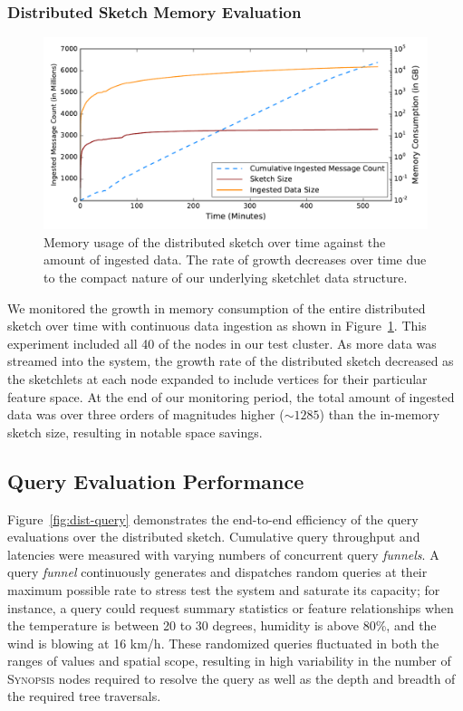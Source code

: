 \subsubsection{Distributed Sketch Memory Evaluation}
%
\begin{figure}
    \centerline{\includegraphics[width=\linewidth]{figures/ing-and-mem-usage.pdf}}
    \caption{Memory usage of the distributed sketch over time against the amount of ingested data. The rate of growth decreases over time due to the compact nature of our underlying sketchlet data structure.}
    \label{fig:dist-sketch-mem-usage}
\end{figure}

We monitored the growth in memory consumption of the entire distributed sketch over time with continuous data ingestion as shown in Figure~\ref{fig:dist-sketch-mem-usage}. This experiment included all 40 of the nodes in our test cluster.  As more data was streamed into the system, the growth rate of the distributed sketch decreased as the sketchlets at each node expanded to include vertices for their particular feature space.  At the end of our monitoring period, the total amount of ingested data was over three orders of magnitudes higher ($\sim 1285$) than the in-memory sketch size, resulting in notable space savings.

\subsection{Query Evaluation Performance}
Figure~\ref{fig:dist-query} demonstrates the end-to-end efficiency of the query evaluations over the distributed sketch.
Cumulative query throughput and latencies were measured with varying numbers of concurrent query \emph{funnels}.
A query \emph{funnel} continuously generates and dispatches random queries at their maximum possible rate to stress test the system and saturate its capacity; for instance, a query could request summary statistics or feature relationships when the temperature is between 20 to 30 degrees, humidity is above 80\%, and the wind is blowing at 16 km/h.
These randomized queries fluctuated in both the ranges of values and spatial scope, resulting in high variability in the number of \textsc{Synopsis} nodes required to resolve the query as well as the depth and breadth of the required tree traversals.

